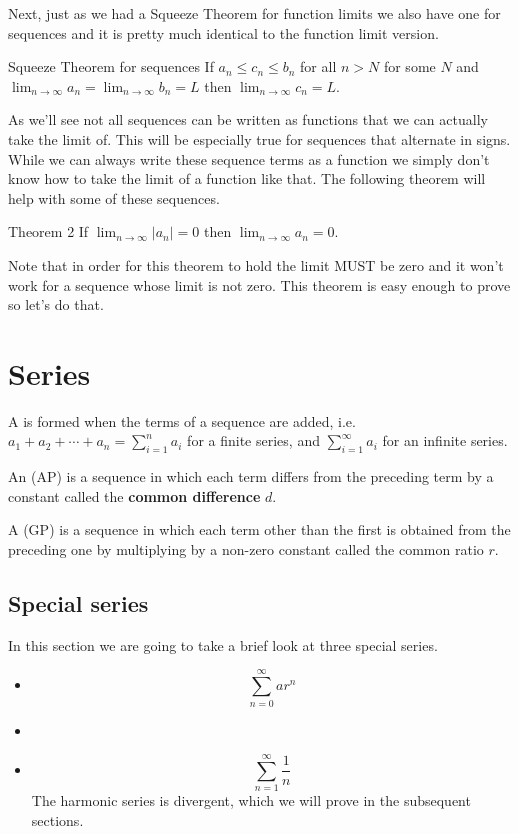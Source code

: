 Next, just as we had a Squeeze Theorem for function limits we also have one for sequences and it is pretty much identical to the function limit version.

\begin{thrm}{Squeeze Theorem for sequences}{}
If $a_n\le c_n\le b_n$ for all $n>N$ for some $N$ and $\lim_{n\to\infty}a_n=\lim_{n\to\infty}b_n=L$ then $\lim_{n\to\infty}c_n=L$.
\end{thrm}

As we’ll see not all sequences can be written as functions that we can actually take the limit of. This will be especially true for sequences that alternate in signs. While we can always write these sequence terms as a function we simply don’t know how to take the limit of a function like that. The following theorem will help with some of these sequences.

Theorem 2
If $\lim_{n\to\infty}|a_n|=0$ then $\lim_{n\to\infty}a_n=0$.

Note that in order for this theorem to hold the limit MUST be zero and it won’t work for a sequence whose limit is not zero. This theorem is easy enough to prove so let’s do that.
\pagebreak

\section{Series}
\begin{definition}
A  is formed when the terms of a sequence are added, i.e. $a_1+a_2+\cdots+a_n=\sum_{i=1}^na_i$ for a finite series, and $\sum_{i=1}^\infty a_i$ for an infinite series.
\end{definition}

An  (AP) is a sequence in which each term differs from the preceding term by a constant called the \textbf{common difference} $d$.

A  (GP) is a sequence in which each term other than the first is obtained from the preceding one by multiplying by a non-zero constant called the common ratio $r$.

\subsection{Special series}
In this section we are going to take a brief look at three special series.
\begin{itemize}
\item {}
\[ \sum_{n=0}^\infty ar^n \]

\item {}

\item {}
\[ \sum_{n=1}^\infty\frac{1}{n} \]
The harmonic series is divergent, which we will prove in the subsequent sections.
\end{itemize}


